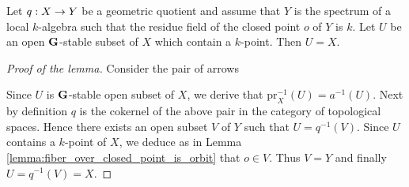 \begin{lemma}\label{lemma:open_and_stable_with_k_point_are_entire}
Let $q:X\rightarrow Y$ be a geometric quotient and assume that $Y$ is the spectrum of a local $k$-algebra such that the residue field of the closed point $o$ of $Y$ is $k$. Let $U$ be an open $\mathbf{G}$-stable subset of $X$ which contain a $k$-point. Then $U = X$. 
\end{lemma}
\begin{proof}[Proof of the lemma]
Consider the pair of arrows
\begin{center}
\end{center}
Since $U$ is $\mathbf{G}$-stable open subset of $X$, we derive that $\mathrm{pr}_X^{-1}(U) = a^{-1}(U)$. Next by definition $q$ is the cokernel of the above pair in the category of topological spaces. Hence there exists an open subset $V$ of $Y$ such that $U = q^{-1}(V)$. Since $U$ contains a $k$-point of $X$, we deduce as in Lemma \ref{lemma:fiber_over_closed_point_is_orbit} that $o\in V$. Thus $V = Y$ and finally $U = q^{-1}(V) = X$.  
\end{proof}

